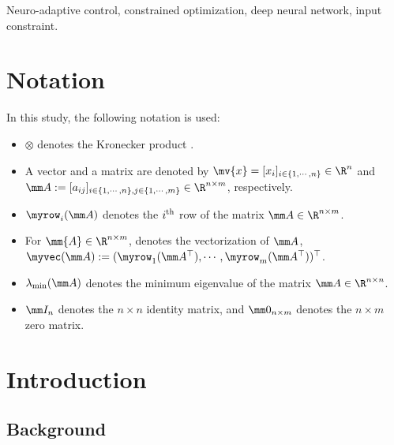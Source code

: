 \documentclass[lettersize,journal]{IEEEtran}
\begin{document}
\begin{IEEEkeywords}
    Neuro-adaptive control, constrained optimization, deep neural network, input constraint.
\end{IEEEkeywords}

\section*{Notation}
In this study, the following notation is used:

\begin{itemize}
    \item $\otimes$ denotes the Kronecker product \cite[Chap. 7 Def. 7.1.2]{Bernstein:2009aa}.
    \item A vector and a matrix are denoted by $\mv{x}=[x_i]_{i\in\{1,\cdots,n\}}\in\R^n$ and $
        \mm A
        := 
        [a_{ij}]
        _{
            i\in\{1,\cdots,n\},j\in\{1,\cdots ,m\}
        }\allowbreak\in\R^{n\times m}
        $, respectively.
    \item $\myrow_i(\mm A)$ denotes the $i\textsuperscript{th}$ row of the matrix $\mm A\in\R^{n\times m}$. 
    \item For $\mm{A}\in\R^{n\times m}$, denotes the vectorization of $\mm A$, $\myvec(\mm A):=(\myrow_1(\mm A^\top),\cdots,\myrow_m(\mm A^\top)  )^\top$.
    \item $\lambda_{\min}(\mm A)$ denotes the minimum eigenvalue of the matrix $\mm A\in\R^{n\times n}$.
    \item $\mm I_n$ denotes the $n\times n$ identity matrix, and $\mm 0_{n\times m}$ denotes the $n\times m$ zero matrix.
\end{itemize}

\section{Introduction}

\subsection{Background}
\end{document}
